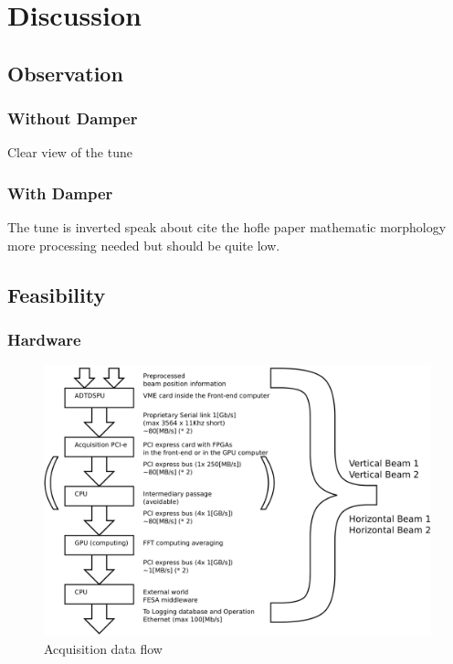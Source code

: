 
\chapter{Discussion}

\section{Observation}

	\subsection{Without Damper}

	Clear view of the tune

	\subsection{With Damper}

	The tune is inverted speak about cite the hofle paper mathematic morphology more processing needed but should be quite low.

\section{Feasibility}

	\subsection{Hardware}

\begin{figure}
\caption{Acquisition data flow}
\centering
\includegraphics[scale=0.3]{dataflow.pdf}
\end{figure}

